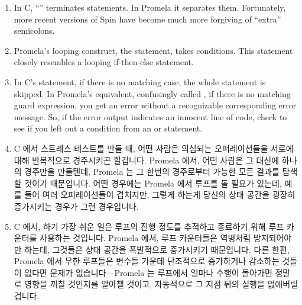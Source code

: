 \begin{enumerate}
\item	In C, ``\co{;}'' terminates statements.  In Promela it separates them.
	Fortunately, more recent versions of Spin have become
	much more forgiving of ``extra'' semicolons.
\item	Promela's looping construct, the  statement, takes
	conditions.
	This  statement closely resembles a looping if-then-else
	statement.
\item	In C's  statement, if there is no matching case, the whole
	statement is skipped.  In Promela's equivalent, confusingly called
	, if there is no matching guard expression, you get an error
	without a recognizable corresponding error message.
	So, if the error output indicates an innocent line of code,
	check to see if you left out a condition from an  or 
	statement.
\fi
\item	C 에서 스트레스 테스트를 만들 때, 어떤 사람은 의심되는 오퍼레이션들을
	서로에 대해 반복적으로 경주시키곤 할겁니다.
	Promela 에서, 어떤 사람은 그 대신에 하나의 경주만을 만들텐데, Promela
	는 그 한번의 경주로부터 가능한 모든 결과를 탐색할 것이기 때문입니다.
	어떤 경우에는 Promela 에서 루프를 돌 필요가 있는데, 예를 들어 여러
	오퍼레이션들이 겹치지만, 그렇게 하는게 당신의 상태 공간을 굉장히
	증가시키는 경우가 그런 경우입니다.
\item	C 에서, 하기 가장 쉬운 일은 루프의 진행 정도를 추적하고 종료하기 위해
	루프 카운터를 사용하는 것입니다.
	Promela 에서, 루프 카운터들은 역병처럼 방지되어야만 하는데, 그것들은
	상태 공간을 폭발적으로 증가시키기 때문입니다.
	다른 한편, Promela 에서 무한 루프들은 변수들 가운데 단조적으로
	증가하거나 감소하는 것들이 없다면 문제가 없습니다---Promela 는 루프에서
	얼마나 수행이 돌아가면 정말로 영향을 끼칠 것인지를 알아챌 것이고,
	자동적으로 그 지점 뒤의 실행을 없애버릴 겁니다.
\iffalse


\end{enumerate}
